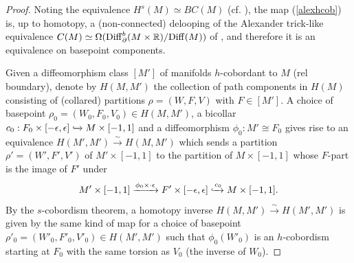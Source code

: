 \documentclass[a4paper, oneside]{amsart}
\newcommand{\diff}{\mathrm{Diff}}
\newcommand{\1}{\mathds{1}}
\theoremstyle{remark}
\theoremstyle{definition}
\newcommand{\R}{{\scaleobj{0.97}{\mathbb{R}}}}
\numberwithin{equation}{section}
\begin{document}
\begin{proof}
Noting the equivalence $H^s(M)\simeq BC(M)$ (cf. \cite[Prop. 2.1]{VogellInvolution}), the map (\ref{alexhcob}) is, up to homotopy, a (non-connected) delooping of the Alexander trick-like equivalence $C(M)\simeq \Omega(\diff_\partial^b(M\times \R)/\diff(M))$ of \cite[Prop. 1.10]{WWI}, and therefore it is an equivalence on basepoint components. 

Given a diffeomorphism class $[M']$ of manifolds $h$-cobordant to $M$ (rel boundary), denote by $H(M,M')$ the collection of path components in $H(M)$ consisting of (collared) partitions $\rho=(W,F,V)$ with $F\in [M']$. A choice of basepoint $\rho_0=(W_0,F_0,V_0)\in H(M,M')$, a bicollar $c_0: F_0\times [-\epsilon,\epsilon]\xhookrightarrow{} M\times [-1,1]$ and a diffeomorphism $\phi_0:M'\cong F_0$ gives rise to an equivalence $H(M',M')\overset{\sim}\to H(M,M')$ which sends a partition $\rho'=(W',F',V')$ of $M'\times [-1,1]$ to the partition of $M\times [-1,1]$ whose $F$-part is the image of $F'$ under
$$
M'\times [-1,1]\xrightarrow{\phi_0\times \cdot\epsilon} F'\times [-\epsilon,\epsilon]\xhookrightarrow{c_0} M\times [-1,1].
$$
By the $s$-cobordism theorem, a homotopy inverse $H(M,M')\xrightarrow{\sim} H(M',M')$ is given by the same kind of map for a choice of basepoint $\rho'_0=(W'_0,F'_0,V'_0)\in H(M',M')$ such that $\phi_0(W'_0)$ is an $h$-cobordism starting at $F_0$ with the same torsion as $V_0$ (the inverse of $W_0$). 


\end{proof}
\end{document}
